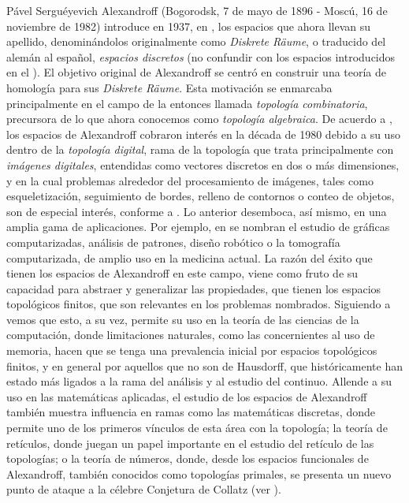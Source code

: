 Pável Serguéyevich Alexandroff (Bogorodsk, 7 de mayo de 1896 - Moscú, 16 de noviembre de 1982) introduce en 1937, en \cite{alexandroff1937}, los espacios que ahora llevan su apellido, denominándolos originalmente como \textit{Diskrete Räume}, o traducido del alemán al español, \textit{espacios discretos} (no confundir con los espacios introducidos en el ). El objetivo original de Alexandroff se centró en construir una teoría de homología para sus \textit{Diskrete Räume}. Esta motivación se enmarcaba principalmente en el campo de la entonces llamada \textit{topología combinatoria}, precursora de lo que ahora conocemos como \textit{topología algebraica}. De acuerdo a \cite{arenas1999}, los espacios de Alexandroff cobraron interés en la década de 1980 debido a su uso dentro de la \textit{topología digital}, rama de la topología que trata principalmente con \textit{imágenes digitales}, entendidas como vectores discretos en dos o más dimensiones, y en la cual problemas alrededor del procesamiento de imágenes, tales como esqueletización, seguimiento de bordes, relleno de contornos o conteo de objetos, son de especial interés, conforme a \cite{kong1989}. Lo anterior desemboca, así mismo, en una amplia gama de aplicaciones. Por ejemplo, en \cite{khalimsky1990} se nombran el estudio de gráficas computarizadas, análisis de patrones, diseño robótico o la tomografía computarizada, de amplio uso en la medicina actual. La razón del éxito que tienen los espacios de Alexandroff en este campo, viene como fruto de su capacidad para abstraer y generalizar las propiedades, que tienen los espacios topológicos finitos, que son relevantes en los problemas nombrados. Siguiendo a \cite{rubiano2013} vemos que esto, a su vez, permite su uso en la teoría de las ciencias de la computación, donde limitaciones naturales, como las concernientes al uso de memoria, hacen que se tenga una prevalencia inicial por espacios topológicos finitos, y en general por aquellos que no son de Hausdorff, que históricamente han estado más ligados a la rama del análisis y al estudio del continuo.  Allende a su uso en las matemáticas aplicadas, el estudio de los espacios de Alexandroff también muestra influencia en ramas como las matemáticas discretas, donde permite uno de los primeros vínculos de esta área con la topología; la teoría de retículos, donde juegan un papel importante en el estudio del retículo de las topologías; o la teoría de números, donde, desde los espacios funcionales de Alexandroff, también conocidos como topologías primales, se presenta un nuevo punto de ataque a la célebre Conjetura de Collatz (ver \cite[Capítulo 5]{mancero2023}).\\\\

